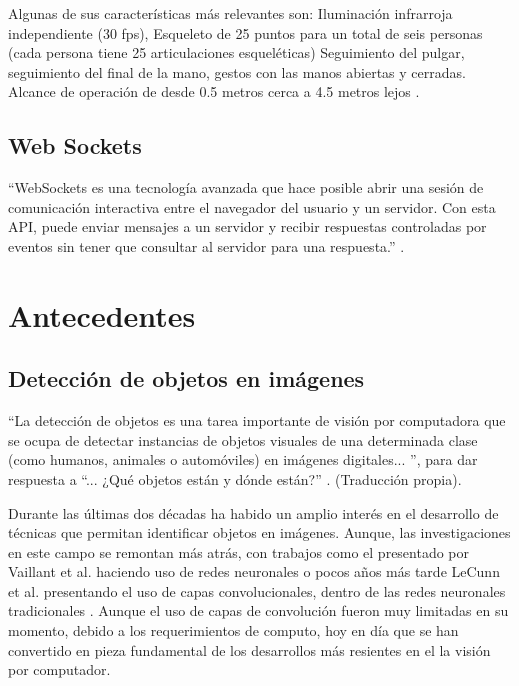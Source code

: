         Algunas de sus características más relevantes son: Iluminación infrarroja independiente (30 fps), Esqueleto de 25 puntos para un total de seis personas (cada persona tiene 25 articulaciones esqueléticas)
        Seguimiento del pulgar, seguimiento del final de la mano, gestos con las manos abiertas y cerradas. Alcance de operación de desde 0.5 metros cerca a 4.5 metros lejos \cite{Kinect2019}.

    \subsection{Web Sockets}
    \label{sub:WebSockets}

        ``WebSockets es una tecnología avanzada que hace posible abrir una sesión de comunicación interactiva entre el navegador del usuario y un servidor. Con esta  API, puede enviar mensajes a un servidor y  recibir  respuestas controladas por eventos sin tener que consultar al servidor para una respuesta.'' \cite{WebSockets2020}.

\section{Antecedentes}
\label{Sec:FrameRelatedWork}

    \subsection{Detección de objetos en imágenes}
    \label{sub:FrameObjectDetection}
        ``La detección de objetos es una tarea importante de visión por computadora que se ocupa de detectar instancias de objetos visuales de una determinada clase (como humanos, animales o automóviles) en imágenes digitales... '', para dar respuesta a ``... ¿Qué objetos están y dónde están?'' \cite{zou2019}. (Traducción propia).
    
        Durante las últimas dos décadas ha habido un amplio interés en el desarrollo de técnicas que permitan identificar objetos en imágenes. Aunque, las investigaciones en este campo se remontan más atrás, con trabajos como el presentado por Vaillant et al. haciendo uso de redes neuronales \cite{Vaillant1994} o pocos años más tarde LeCunn et al. presentando el uso de capas convolucionales, dentro de las redes neuronales tradicionales \cite{LeCun1998}. Aunque el uso de capas de convolución fueron muy limitadas en su momento,  debido a los requerimientos de computo, hoy en día que se han convertido en pieza fundamental de los desarrollos más resientes en el la visión por computador.
        
